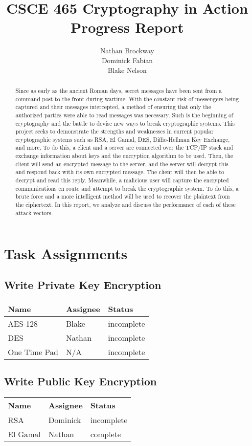 \documentclass{report}
\title{CSCE 465 Cryptography in Action Progress Report}
\author{Nathan Brockway\\Dominick Fabian\\Blake Nelson}
\begin{document}
\maketitle

\begin{abstract}
    Since as early as the ancient Roman days, secret messages have been sent from a command post to the front during wartime. With the constant risk of messengers being captured and their messages intercepted, a method of ensuring that only the authorized parties were able to read messages was necessary. Such is the beginning of cryptography and the battle to devise new ways to break cryptographic systems. This project seeks to demonstrate the strengths and weaknesses in current popular cryptographic systems such as RSA, El Gamal, DES, Diffie-Hellman Key Exchange, and more. To do this, a client and a server are connected over the TCP/IP stack and exchange information about keys and the encryption algorithm to be used. Then, the client will send an encrypted message to the server, and the server will decrypt this and respond back with its own encrypted message. The client will then be able to decrypt and read this reply. Meanwhile, a malicious user will capture the encrypted communications en route and attempt to break the cryptographic system. To do this, a brute force and a more intelligent method will be used to recover the plaintext from the ciphertext. In this report, we analyze and discuss the performance of each of these attack vectors.
\end{abstract}

\section{Task Assignments}
\subsection{Write Private Key Encryption}
\begin{tabular}{l|l|l}
    Name & Assignee & Status \\ \hline
    AES-128 & Blake & incomplete \\
    DES & Nathan & incomplete \\
    One Time Pad & N/A & incomplete	 
\end{tabular}

\subsection{Write Public Key Encryption}
\begin{tabular}{l|l|l}
    Name & Assignee & Status \\ \hline
    RSA & Dominick & incomplete \\
    El Gamal & Nathan & complete
\end{tabular}
\end{document}
